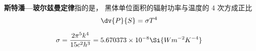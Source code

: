 
\textbf{斯特潘—玻尔兹曼定律}指的是， 黑体单位面积的辐射功率与温度的 4 次方成正比
\begin{equation}
\dv{P}{S} = \sigma T^4
\end{equation}

\begin{equation}
\sigma = \frac{2\pi^5k^4}{15c^2h^3} = 5.670373 \times 10^{-8} \Si{Wm^{-2}K^{-4}}
\end{equation}
